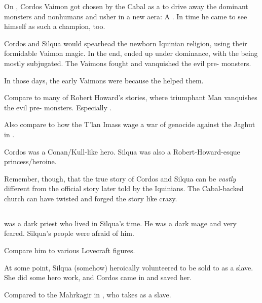 On \Azmith, Cordos Vaimon got chosen by the Cabal as a  to drive away the dominant monsters and nonhumans and usher in a new aera: 
A . 
In time he came to see himself as such a champion, too. 

Cordos and Silqua would spearhead the newborn Iquinian religion, using their formidable Vaimon magic. 
In the end, \Azmith{} ended up under \human{} dominance, with the \scathae{} being mostly subjugated. 
The Vaimons fought and vanquished the evil pre-\human{} monsters. 

In those days, the early Vaimons were  because the \resphain helped them. 

Compare to many of Robert Howard's stories, where triumphant Man vanquishes the evil pre-\human{} monsters. 
Especially \cite{RobertEHoward:TheShadowKingdom}. 

Also compare to how the T'lan Imass wage a war of genocide against the Jaghut in \cite{StevenEriksonIanCameronEsslemont:MalazanBookoftheFallen}. 

Cordos was a Conan/Kull-like hero. 
Silqua was also a Robert-Howard-esque princess/heroine. 

Remember, though, that the true story of Cordos and Silqua can be \emph{vastly} different from the official story later told by the Iquinians. 
The Cabal-backed church can have twisted and forged the story like crazy. 









\subsection[Byakun]{\Byakun}
\Byakun was a dark priest who lived in Silqua's time. 
He was a dark mage and very feared. 
Silqua's people were afraid of him. 

Compare him to various Lovecraft figures. 

At some point, Silqua (somehow) heroically volunteered to be sold to \Byakun as a slave. 
She did some hero work, and Cordos came in and saved her. 

Compared to the Mahrkagir in \cite{JacquelineCarey:KushielsAvatar}, who takes \Phedre as a slave. 










